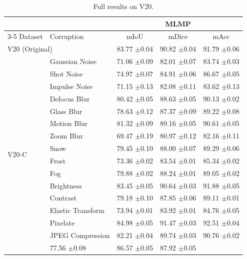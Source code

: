 \documentclass{article}
\begin{document}
\begin{table}[t]
\centering
\caption{Full results on V20.}
\label{tab:results_v20}
\begin{tabular}{ll|ccc}
\toprule
 & & \multicolumn{3}{c}{MLMP} \\
\cmidrule(lr){3-5}
Dataset & Corruption & mIoU & mDice & mAcc \\
\midrule
\multicolumn{2}{l}{V20 (Original)} & 83.77 {\scriptsize $\pm$0.04} & 90.82 {\scriptsize $\pm$0.04} & 91.79 {\scriptsize $\pm$0.06} \\
\multirow{16}{*}{V20-C} & Gaussian Noise & 71.06 {\scriptsize $\pm$0.09} & 82.01 {\scriptsize $\pm$0.07} & 83.74 {\scriptsize $\pm$0.03} \\
 & Shot Noise & 74.97 {\scriptsize $\pm$0.07} & 84.91 {\scriptsize $\pm$0.06} & 86.67 {\scriptsize $\pm$0.05} \\
 & Impulse Noise & 71.15 {\scriptsize $\pm$0.13} & 82.08 {\scriptsize $\pm$0.11} & 83.62 {\scriptsize $\pm$0.13} \\
 & Defocus Blur & 80.42 {\scriptsize $\pm$0.05} & 88.63 {\scriptsize $\pm$0.05} & 90.13 {\scriptsize $\pm$0.02} \\
 & Glass Blur & 78.63 {\scriptsize $\pm$0.12} & 87.37 {\scriptsize $\pm$0.09} & 89.22 {\scriptsize $\pm$0.08} \\
 & Motion Blur & 81.32 {\scriptsize $\pm$0.09} & 89.16 {\scriptsize $\pm$0.05} & 90.61 {\scriptsize $\pm$0.05} \\
 & Zoom Blur & 69.47 {\scriptsize $\pm$0.19} & 80.97 {\scriptsize $\pm$0.12} & 82.16 {\scriptsize $\pm$0.11} \\
 & Snow & 79.45 {\scriptsize $\pm$0.10} & 88.00 {\scriptsize $\pm$0.07} & 89.29 {\scriptsize $\pm$0.06} \\
 & Frost & 73.36 {\scriptsize $\pm$0.02} & 83.54 {\scriptsize $\pm$0.01} & 85.34 {\scriptsize $\pm$0.02} \\
 & Fog & 79.88 {\scriptsize $\pm$0.02} & 88.24 {\scriptsize $\pm$0.01} & 89.05 {\scriptsize $\pm$0.02} \\
 & Brightness & 83.45 {\scriptsize $\pm$0.05} & 90.64 {\scriptsize $\pm$0.03} & 91.88 {\scriptsize $\pm$0.05} \\
 & Contrast & 79.18 {\scriptsize $\pm$0.10} & 87.85 {\scriptsize $\pm$0.06} & 89.11 {\scriptsize $\pm$0.01} \\
 & Elastic Transform & 73.94 {\scriptsize $\pm$0.01} & 83.92 {\scriptsize $\pm$0.01} & 84.76 {\scriptsize $\pm$0.05} \\
 & Pixelate & 84.98 {\scriptsize $\pm$0.05} & 91.47 {\scriptsize $\pm$0.03} & 92.51 {\scriptsize $\pm$0.04} \\
 & JPEG Compression & 82.21 {\scriptsize $\pm$0.04} & 89.74 {\scriptsize $\pm$0.03} & 90.76 {\scriptsize $\pm$0.02} \\
\cmidrule(l){2-5}
\multicolumn{2}{l}{\textit{V20-C Average}} & 77.56 {\scriptsize $\pm$0.08} & 86.57 {\scriptsize $\pm$0.05} & 87.92 {\scriptsize $\pm$0.05} \\
\bottomrule
\end{tabular}
\end{table}
\end{document}
